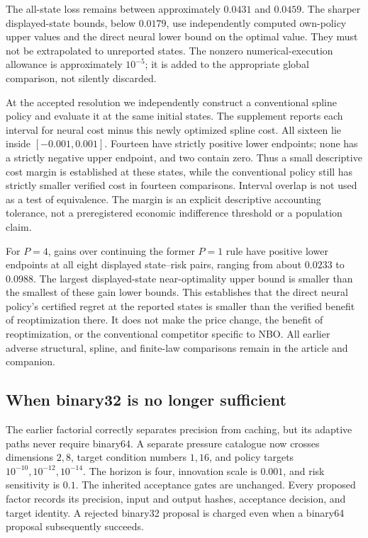 The all-state loss remains between approximately $0.0431$ and $0.0459$.
The sharper displayed-state bounds, below $0.0179$, use independently
computed own-policy upper values and the direct neural lower bound on the
optimal value. They must not be extrapolated to unreported states. The
nonzero numerical-execution allowance is approximately $10^{-5}$; it is
added to the appropriate global comparison, not silently discarded.

At the accepted resolution we independently construct a conventional
spline policy and evaluate it at the same initial states. The supplement
reports each interval for neural cost minus this newly optimized spline
cost. All sixteen lie inside $[-0.001,0.001]$. Fourteen have strictly positive
lower endpoints; none has a strictly negative upper endpoint, and two
contain zero. Thus a small descriptive cost margin is established at these
states, while the conventional policy still has strictly smaller verified
cost in fourteen comparisons. Interval overlap is not used as a test of
equivalence. The margin is an explicit descriptive accounting tolerance,
not a preregistered economic indifference threshold or a population claim.

For $P=4$, gains over continuing the former $P=1$ rule have positive lower
endpoints at all eight displayed state--risk pairs, ranging from about
$0.0233$ to $0.0988$. The largest displayed-state near-optimality upper
bound is smaller than the smallest of these gain lower bounds. This
establishes that the direct neural policy's certified regret at the reported
states is smaller than the verified benefit of reoptimization there. It
does not make the price change, the benefit of reoptimization, or the
conventional competitor specific to NBO. All earlier adverse structural,
spline, and finite-law comparisons remain in the article and companion.

\subsection{When binary32 is no longer sufficient}
The earlier factorial correctly separates precision from caching, but its
adaptive paths never require binary64. A separate pressure catalogue now
crosses dimensions $2,8$, target condition numbers $1,16$, and policy targets
$10^{-10},10^{-12},10^{-14}$. The horizon is four, innovation scale is
$0.001$, and risk sensitivity is $0.1$. The inherited acceptance gates are
unchanged. Every proposed factor records its precision, input and output
hashes, acceptance decision, and target identity. A rejected binary32
proposal is charged even when a binary64 proposal subsequently succeeds.

